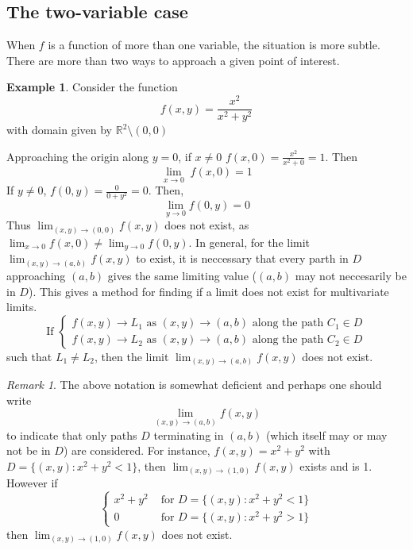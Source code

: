 \documentclass[a6paper]{article}
\theoremstyle{definition}
\newtheorem{example}{Example}
\theoremstyle{plain}
\theoremstyle{remark}
\newtheorem*{remark}{Remark}
\begin{document}
    \subsection{The two-variable case}
    When $ f $ is a function of more than one variable, the situation is more
    subtle. There are more than two ways to approach a given point of interest.
    \begin{example}
    Consider the function
    $$ f(x,y) = \frac{x^2}{x^2 + y^2} $$
    with domain given by $ \mathbb{R}^2 \setminus {(0,0)} $
    \end{example}
    Approaching the origin along $ y = 0 $, if $ x \neq 0  $ $ f(x,0)
    = \displaystyle \frac{x^2}{x^2 + 0} = 1$. Then 
    $$ \lim_{x\to 0} \; f(x,0) = 1 $$
    If $ y \neq 0  $, $ f(0,y) = \displaystyle \frac{0}{0+y^2} = 0 $. Then,
    $$ \lim_{y \to 0}  f(0,y) = 0 $$
    Thus $ \displaystyle \lim_{(x,y) \to (0,0)} f(x,y) $ does not exist, as
    $ \displaystyle \lim_{x\to 0} f(x,0) \neq \displaystyle \lim_{y\to 0}
    f(0,y) $. In general, for the limit $ \displaystyle \lim_{(x,y) \to (a,b)}
    f(x,y)$ to exist, it is neccessary that every parth in $ D $ approaching
    $ (a,b) $ gives the same limiting value ($ (a,b) $ may not neccesarily be
    in $ D $). This gives a method for finding if a limit does not exist for
    multivariate limits.
    \[
      \text{If } \displaystyle \begin{cases}
      f(x,y) \to L_1 \text{ as } (x,y) \to (a,b) \text{ along the path } C_1
      \in D\\
      f(x,y) \to L_2 \text{ as } (x,y) \to (a,b) \text { along the path } C_2
      \in  D
    \end{cases} 
\]
    such that $ L_1 \neq L_2 $, then the limit $ \displaystyle \lim_{(x,y) \to
    (a,b)} f(x,y) $ does not exist.
  \begin{remark}
  The above notation is somewhat deficient and perhaps one should write
  $$ \lim_{(x,y) \to (a,b)} f(x,y) $$
  to indicate that only paths $ D $ terminating in $ (a,b) $ (which itself may
  or may not be in $ D $) are considered. For instance,
  $ f(x,y) = x^2 + y^2 $ with $ D = \{(x,y): x^2 + y^2 < 1\} $, then
  $ \displaystyle \lim_{(x,y) \to (1,0)}  f(x,y) $ exists and is 1. However if 
  \[
    \begin{cases}
      x^2 + y^2 &\text{ for } D = \{(x,y): x^2 + y^2 < 1\}\\
      0 &\text{ for } D = \{(x,y): x^2 + y^2 > 1\}
    \end{cases}
    \]
    then $ \displaystyle \lim_{(x,y) \to (1,0)} f(x,y) $ does not exist.
    \end{remark}
\end{document}
